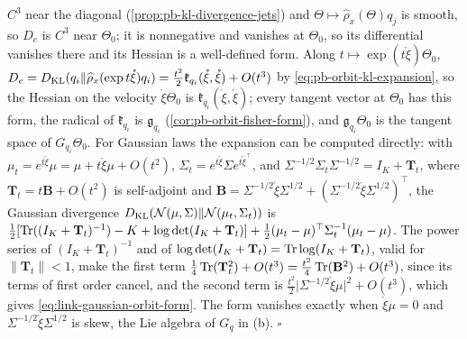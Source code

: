$C^3$ near the diagonal (\cref{prop:pb-kl-divergence-jets}) and $\Theta\mapsto\widehat\rho_x(\Theta)q_j$ is smooth,
so $D_e$ is $C^3$ near $\Theta_0$; it is nonnegative and vanishes at $\Theta_0$, so its differential vanishes
there and its Hessian is a well-defined form. Along $t\mapsto\exp(t\mathring\xi)\Theta_0$,
$D_e=D_{\mathrm{KL}}(q_i\Vert\widehat\rho_x(\exp t\mathring\xi)q_i)=\frac{t^2}2\mathfrak k_{q_i}(\mathring\xi,\mathring\xi)+O(t^3)$ by
\eqref{eq:pb-orbit-kl-expansion}, so the Hessian on the velocity $\mathring\xi\Theta_0$ is $\mathfrak k_{q_i}(\mathring\xi,\mathring\xi)$; every
tangent vector at $\Theta_0$ has this form, the radical of $\mathfrak k_{q_i}$ is $\mathfrak g_{q_i}$
(\cref{cor:pb-orbit-fisher-form}), and $\mathfrak g_{q_i}\Theta_0$ is the tangent space of $G_{q_i}\Theta_0$. For
Gaussian laws the expansion can be computed directly: with
$\mu_t=e^{t\mathring\xi}\mu=\mu+t\mathring\xi\mu+O(t^2)$, $\Sigma_t=e^{t\mathring\xi}\Sigma e^{t\mathring\xi^\top}$, and
$\Sigma^{-1/2}\Sigma_t\Sigma^{-1/2}=I_K+\mathbf T_t$, where $\mathbf T_t=t\mathbf B+O(t^2)$ is self-adjoint and
$\mathbf B=\Sigma^{-1/2}\mathring\xi\Sigma^{1/2}+(\Sigma^{-1/2}\mathring\xi\Sigma^{1/2})^\top$, the Gaussian divergence
$D_{\mathrm{KL}}(\mathcal N(\mu,\Sigma)\Vert\mathcal N(\mu_t,\Sigma_t))$ is
$\frac12[\operatorname{Tr}((I_K+\mathbf T_t)^{-1})-K+\log\det(I_K+\mathbf T_t)]+\frac12(\mu_t-\mu)^\top\Sigma_t^{-1}(\mu_t-\mu)$.
The power series of $(I_K+\mathbf T_t)^{-1}$ and of $\log\det(I_K+\mathbf T_t)=\operatorname{Tr}\log(I_K+\mathbf T_t)$, valid
for $\lVert\mathbf T_t\rVert<1$, make the first term $\frac14\operatorname{Tr}(\mathbf T_t^2)+O(t^3)=\frac{t^2}4\operatorname{Tr}(\mathbf B^2)+O(t^3)$,
since its terms of first order cancel, and the second term is
$\frac{t^2}2\lvert\Sigma^{-1/2}\mathring\xi\mu\rvert^2+O(t^3)$, which gives \eqref{eq:link-gaussian-orbit-form}. The form
vanishes exactly when $\mathring\xi\mu=0$ and $\Sigma^{-1/2}\mathring\xi\Sigma^{1/2}$ is skew, the Lie algebra of $G_q$ in (b).
\hfill$\square$

